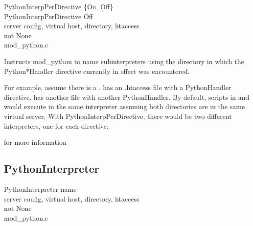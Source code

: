 PythonInterpPerDirective \{On, Off\} \\
PythonInterpPerDirective Off\\
server config, virtual host, directory, htaccess\\
not None\\
mod_python.c

Instructs mod_python to name subinterpreters using the directory in
which the Python*Handler directive currently in effect was
encountered.

For example, assume there is a
.  has an .htaccess
file with a PythonHandler directive.  
has another  file with another PythonHandler. By
default, scripts in  and
 would execute in the same interpreter
assuming both directories are in the same virtual server. With
PythonInterpPerDirective, there would be two different interpreters,
one for each directive.

\begin{seealso}
	{for more information}
\end{seealso}

\subsection{PythonInterpreter\label{dir-other-pi}}

PythonInterpreter name \\
server config, virtual host, directory, htaccess\\
not None\\
mod_python.c

